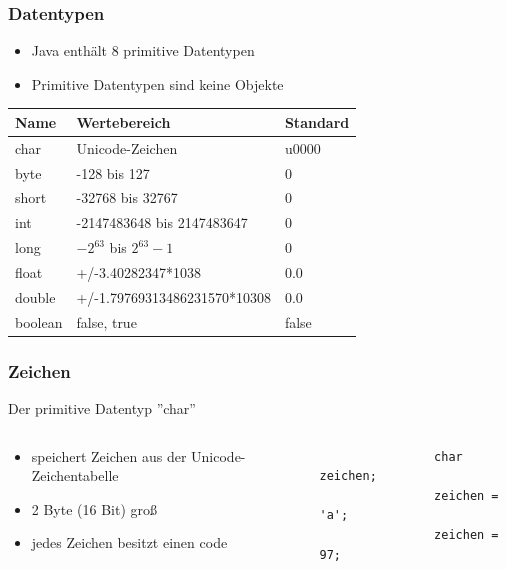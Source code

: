 \begin{frame}[fragile]
	\frametitle{Datentypen}
	\small
	\begin{itemize}
	  \item Java enth\"alt 8 primitive Datentypen
	  \item Primitive Datentypen sind keine Objekte
	\end{itemize}
	\begin{table}
	\begin{tabular}{l|l|l}
			Name & Wertebereich & Standard\\ \hline
			char & Unicode-Zeichen & u0000 \\
			byte  & -128 bis 127 & 0 \\ 
			short & -32768 bis 32767 & 0 \\
			int & -2147483648 bis 2147483647 & 0 \\
			long & $-2^{63}$ bis $2^{63}-1$ & 0 \\
			float & +/-3.40282347*1038 & 0.0 \\
			double & +/-1.79769313486231570*10308 & 0.0 \\
			boolean& false, true & false \\
	\end{tabular}
	\end{table}
	\normalsize
\end{frame}

\begin{frame}[fragile]
	\frametitle{Zeichen}
	Der primitive Datentyp ''char''
	\begin{columns}
		\begin{column}{0.5\textwidth}
			\begin{itemize}
			  \item speichert Zeichen aus der Unicode-Zeichentabelle
			  \item 2 Byte (16 Bit) groß
			  \item jedes Zeichen besitzt einen code
			\end{itemize}
		\end{column}
		\begin{column}{0.5\textwidth}
		\begin{lstlisting}
				char zeichen;
				zeichen = 'a';
				zeichen = 97;
		\end{lstlisting}
		\end{column}
	\end{columns}
\end{frame}

